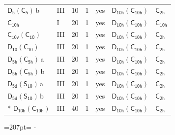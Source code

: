 \documentclass[10pt,a4paper]{article}
\newcommand{\needspace}[1]{\par\penalty-100\begingroup\dimen0=#1\relax\dimen2=\pagegoal
  \advance\dimen2-\pagetotal\ifdim\dimen0>\dimen2\relax\ifdim\dimen2>0pt\vfil\break\fi\fi
  \endgroup}
\numberwithin{equation}{section}
\newcommand{\grp}[1]{\mathsf{#1}}
\newcommand{\clsletter}[1]{\,{\scriptsize\color{black!55}#1}}
\begin{document}
{\begin{longtable}{@{}llrrlll@{}}
\href{D5-C5.pdf}{$\grp{D_{5}}(\grp{C_{5}})$}\clsletter{b} & III & 10 & 1 & yes & \href{D10h-C10h.pdf}{$\grp{D_{10h}}(\grp{C_{10h}})$} & \href{../../../rotation/data/pdf/C2h.pdf}{$\grp{C_{2h}}$}\\
\href{../../../rotation/data/pdf/C10h.pdf}{$\grp{C_{10h}}$} & I & 20 & 1 & yes & \href{D10h-C10h.pdf}{$\grp{D_{10h}}(\grp{C_{10h}})$} & \href{../../../rotation/data/pdf/C10h.pdf}{$\grp{C_{10h}}$}\\
\href{C10v-C10.pdf}{$\grp{C_{10v}}(\grp{C_{10}})$} & III & 20 & 1 & yes & \href{D10h-C10h.pdf}{$\grp{D_{10h}}(\grp{C_{10h}})$} & \href{../../../rotation/data/pdf/C2h.pdf}{$\grp{C_{2h}}$}\\
\href{D10-C10.pdf}{$\grp{D_{10}}(\grp{C_{10}})$} & III & 20 & 1 & yes & \href{D10h-C10h.pdf}{$\grp{D_{10h}}(\grp{C_{10h}})$} & \href{../../../rotation/data/pdf/C2h.pdf}{$\grp{C_{2h}}$}\\
\href{D5h-C5h.pdf}{$\grp{D_{5h}}(\grp{C_{5h}})$}\clsletter{a} & III & 20 & 1 & yes & \href{D10h-C10h.pdf}{$\grp{D_{10h}}(\grp{C_{10h}})$} & \href{../../../rotation/data/pdf/C2h.pdf}{$\grp{C_{2h}}$}\\
\href{D5h-C5h.pdf}{$\grp{D_{5h}}(\grp{C_{5h}})$}\clsletter{b} & III & 20 & 1 & yes & \href{D10h-C10h.pdf}{$\grp{D_{10h}}(\grp{C_{10h}})$} & \href{../../../rotation/data/pdf/C2h.pdf}{$\grp{C_{2h}}$}\\
\href{D5d-S10.pdf}{$\grp{D_{5d}}(\grp{S_{10}})$}\clsletter{a} & III & 20 & 1 & yes & \href{D10h-C10h.pdf}{$\grp{D_{10h}}(\grp{C_{10h}})$} & \href{../../../rotation/data/pdf/C2h.pdf}{$\grp{C_{2h}}$}\\
\href{D5d-S10.pdf}{$\grp{D_{5d}}(\grp{S_{10}})$}\clsletter{b} & III & 20 & 1 & yes & \href{D10h-C10h.pdf}{$\grp{D_{10h}}(\grp{C_{10h}})$} & \href{../../../rotation/data/pdf/C2h.pdf}{$\grp{C_{2h}}$}\\*
\href{D10h-C10h.pdf}{$\grp{D_{10h}}(\grp{C_{10h}})$} & III & 40 & 1 & yes & \href{D10h-C10h.pdf}{$\grp{D_{10h}}(\grp{C_{10h}})$} & \href{../../../rotation/data/pdf/C2h.pdf}{$\grp{C_{2h}}$}\\
\bottomrule\end{longtable}}
\needspace{207pt}
\end{document}
